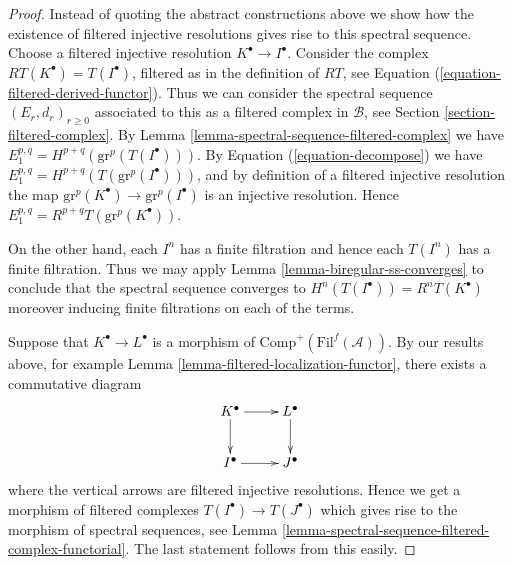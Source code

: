 \begin{proof}
Instead of quoting the abstract constructions above we
show how the existence of filtered injective resolutions gives
rise to this spectral sequence.
Choose a filtered injective resolution $K^\bullet \to I^\bullet$.
Consider the complex $RT(K^\bullet) = T(I^\bullet)$, filtered as
in the definition of $RT$, see
Equation (\ref{equation-filtered-derived-functor}).
Thus we can consider the spectral sequence
$(E_r, d_r)_{r \geq 0}$ associated to
this as a filtered complex in $\mathcal{B}$, see
Section \ref{section-filtered-complex}.
By Lemma \ref{lemma-spectral-sequence-filtered-complex}
we have $E_1^{p, q} = H^{p + q}(\text{gr}^p(T(I^\bullet)))$.
By Equation (\ref{equation-decompose}) we have
$E_1^{p, q} = H^{p + q}(T(\text{gr}^p(I^\bullet)))$, and
by definition of a filtered injective resolution the
map $\text{gr}^p(K^\bullet) \to \text{gr}^p(I^\bullet)$
is an injective resolution. Hence
$E_1^{p, q} = R^{p + q}T(\text{gr}^p(K^\bullet))$.

\medskip\noindent
On the other hand, each $I^n$ has a finite filtration and hence
each $T(I^n)$ has a finite filtration. Thus we may apply
Lemma \ref{lemma-biregular-ss-converges} to conclude that the
spectral sequence converges to $H^n(T(I^\bullet)) = R^nT(K^\bullet)$
moreover inducing finite filtrations on each of the terms.

\medskip\noindent
Suppose that $K^\bullet \to L^\bullet$ is a morphism of
$\text{Comp}^{+}(\text{Fil}^f(\mathcal{A}))$. By our results above,
for example Lemma \ref{lemma-filtered-localization-functor}, there
exists a commutative diagram
$$
\xymatrix{
K^\bullet \ar[r] \ar[d] & L^\bullet \ar[d] \\
I^\bullet \ar[r] & J^\bullet
}
$$
where the vertical arrows are filtered injective resolutions.
Hence we get a morphism of filtered complexes
$T(I^\bullet) \to T(J^\bullet)$ which gives rise to the
morphism of spectral sequences, see
Lemma \ref{lemma-spectral-sequence-filtered-complex-functorial}.
The last statement follows from this easily.
\end{proof}

